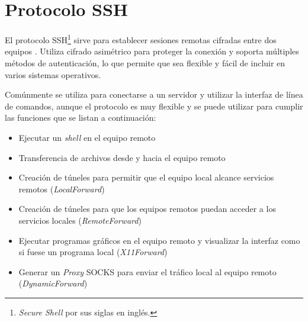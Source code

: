 \newpage
\section {Protocolo \textsc{SSH}}
\label{Protocolo-SSH}
El protocolo \textsc{\gls{SSH}}\footnote{\textit{Secure Shell} por sus siglas en ingl\'{e}s.} sirve para establecer sesiones remotas cifradas entre dos equipos \cite{_ssh_????-1}. Utiliza cifrado asim\'{e}trico para proteger la conexi\'{o}n y soporta m\'{u}ltiples m\'{e}todos de autenticaci\'{o}n, lo que permite que sea flexible y f\'{a}cil de incluir en varios sistemas operativos.

Com\'{u}nmente se utiliza para conectarse a un servidor y utilizar la interfaz de l\'{i}nea de comandos, aunque el protocolo es muy flexible y se puede utilizar para cumplir las funciones que se listan a continuaci\'{o}n:

  \begin{itemize}
    \item Ejecutar un \emph{\gls{shell}} en el equipo remoto
    \item Transferencia de archivos desde y hacia el equipo remoto
    \item Creaci\'{o}n de t\'{u}neles para permitir que el equipo local alcance servicios remotos (\textit{LocalForward})
    \item Creaci\'{o}n de t\'{u}neles para que los equipos remotos puedan acceder a los servicios locales (\textit{RemoteForward})
    \item Ejecutar programas gr\'{a}ficos en el equipo remoto y visualizar la interfaz como si fuese un programa local (\textit{X11Forward})
    \item Generar un \emph{\gls{Proxy}} \textsc{SOCKS} para enviar el tr\'{a}fico local al equipo remoto (\textit{DynamicForward})
  \end{itemize}


